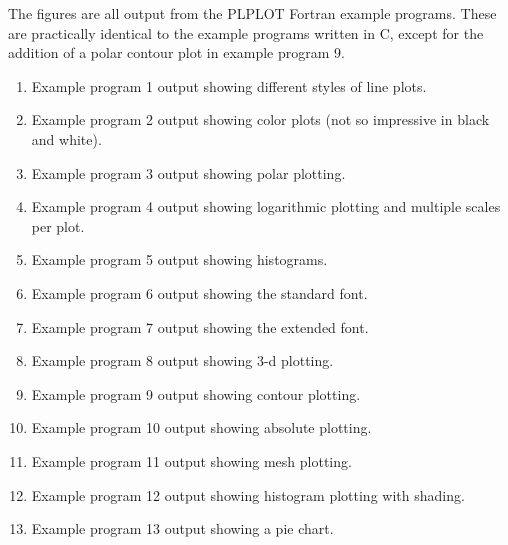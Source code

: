 

The figures are all output from the PLPLOT Fortran example programs.
These are practically identical to the example programs written in C,
except for the addition of a polar contour plot in example program 9.

\begin{enumerate}
\item
Example program 1 output showing different styles of line plots.

\item
Example program 2 output showing color plots (not so impressive
in black and white).

\item
Example program 3 output showing polar plotting.

\item
Example program 4 output showing logarithmic plotting and multiple scales
per plot.

\item
Example program 5 output showing histograms.

\item
Example program 6 output showing the standard font.

\item
Example program 7 output showing the extended font.

\item
Example program 8 output showing 3-d plotting.

\item
Example program 9 output showing contour plotting.

\item
Example program 10 output showing absolute plotting.

\item
Example program 11 output showing mesh plotting.

\item
Example program 12 output showing histogram plotting with shading.

\item
Example program 13 output showing a pie chart.

\end{enumerate}

